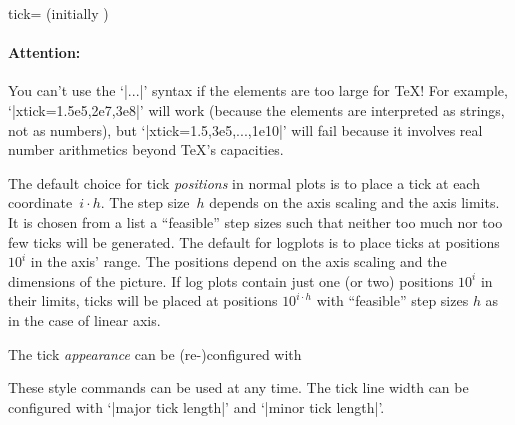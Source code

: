 \begin{pgfplotsxykey}{\x tick= (initially \marg{})}
\begin{codeexample}[]
\end{codeexample}

\paragraph{Attention:} You can't use the `|...|' syntax if the elements are too large for \TeX! For example, `|xtick=1.5e5,2e7,3e8|' will work (because the elements are interpreted as strings, not as numbers), but `|xtick=1.5,3e5,...,1e10|' will fail because it involves real number arithmetics beyond \TeX's capacities.
\vspace*{0.3cm}

\noindent
The default choice for tick \emph{positions} in normal plots is to place a tick at each coordinate~$i\cdot h$. The step size~$h$ depends on the axis scaling and the axis limits. It is chosen from a list a ``feasible'' step sizes such that neither too much nor too few ticks will be generated. The default for logplots is to place ticks at positions $10^i$ in the axis' range. The positions depend on the axis scaling and the dimensions of the picture. If log plots contain just one (or two) positions $10^i$ in their limits, ticks will be placed at positions $10^{i\cdot h}$ with ``feasible'' step sizes $h$ as in the case of linear axis.

\noindent
The tick \emph{appearance} can be (re-)configured with
\begin{codeexample}
\end{codeexample}

These style commands can be used at any time. The tick line width can be configured with `|major tick length|' and `|minor tick length|'.

\begin{codeexample}[]
\end{codeexample}


\end{pgfplotsxykey}
